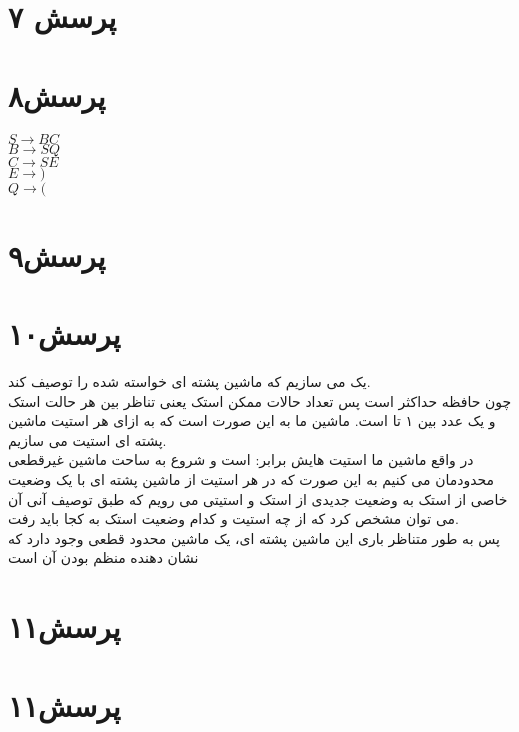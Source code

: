 \documentclass[a4paper]{article}
\begin{document}
\pagebreak

\section*{پرسش ۷}

\pagebreak
\section*{پرسش۸}
\begin{latin}
$ S \rightarrow BC $\\
$ B \rightarrow SQ $\\
$ C \rightarrow SE $\\
$ E \rightarrow ) $\\
$ Q \rightarrow ( $\\

\end{latin}
\pagebreak
\section*{پرسش۹}
\pagebreak
\section*{پرسش۱۰}
یک 
می سازیم که ماشین پشته ای خواسته شده را توصیف کند.\\
چون حافظه حداکثر 
است پس تعداد حالات ممکن استک
یعنی تناظر بین هر حالت استک و یک عدد بین ۱ تا 
است.
ماشین ما به این صورت است که به ازای هر استیت ماشین پشته ای 
استیت می سازیم.\\
در واقع ماشین ما استیت هایش برابر:
است و شروع به ساحت ماشین غیرقطعی محدودمان می کنیم به این صورت که در هر استیت از ماشین پشته ای با یک وضعیت خاصی از استک به وضعیت جدیدی از استک و استیتی می رویم که طبق توصیف آنی آن می توان مشخص کرد که از چه استیت و کدام وضعیت استک به کجا باید رفت.\\
پس به طور متناظر باری این ماشین پشته ای، یک ماشین محدود قطعی وجود دارد که نشان دهنده منظم بودن آن است
\pagebreak
\section*{پرسش۱۱}
\pagebreak
\section*{پرسش۱۱}
\pagebreak
\end{document}
